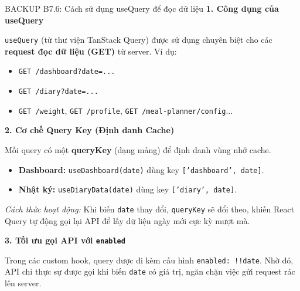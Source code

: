 \documentclass[10pt, aspectratio=169]{beamer}
\begin{document}
\begin{frame}[fragile, label=b7_6]{BACKUP B7.6: Cách sử dụng useQuery để đọc dữ liệu}
\hypertarget{b7_6_target}{}
    \textbf{1. Công dụng của useQuery}
    \vspace{0.1cm}
    
    \texttt{useQuery} (từ thư viện TanStack Query) được sử dụng chuyên biệt cho các \textbf{request đọc dữ liệu (GET)} từ server. Ví dụ:
    
    \begin{itemize}
        \item \texttt{GET /dashboard?date=...}
        \item \texttt{GET /diary?date=...}
        \item \texttt{GET /weight}, \texttt{GET /profile}, \texttt{GET /meal-planner/config}...
    \end{itemize}

    \vspace{0.1cm}
    \textbf{2. Cơ chế Query Key (Định danh Cache)}
    \vspace{0.1cm}
    
    Mỗi query có một \textbf{queryKey} (dạng mảng) để định danh vùng nhớ cache.
    
    \begin{itemize}
        \item \textbf{Dashboard:} \texttt{useDashboard(date)} dùng key \texttt{['dashboard', date]}.
        \item \textbf{Nhật ký:} \texttt{useDiaryData(date)} dùng key \texttt{['diary', date]}.
    \end{itemize}
    \textit{Cách thức hoạt động:} Khi biến \texttt{date} thay đổi, \texttt{queryKey} sẽ đổi theo, khiến React Query tự động gọi lại API để lấy dữ liệu ngày mới cực kỳ mượt mà.

    \vspace{0.15cm}
    \textbf{3. Tối ưu gọi API với \texttt{enabled}}
    \vspace{0.1cm}
    
    Trong các custom hook, query được đi kèm cấu hình \texttt{enabled: !!date}. Nhờ đó, API chỉ thực sự được gọi khi biến \texttt{date} có giá trị, ngăn chặn việc gửi request rác lên server.
\end{frame}
\end{document}
